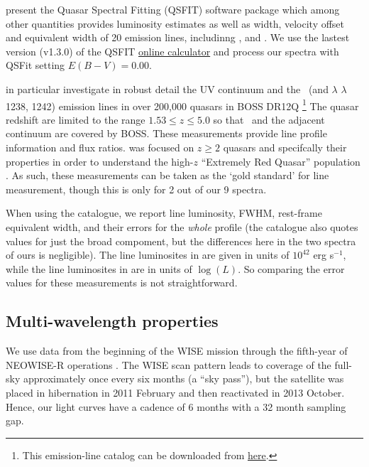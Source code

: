 \documentclass[a4paper,fleqn,usenatbib]{mnras}
\begin{document}
\citet{Calderone2017} present the Quasar Spectral Fitting (QSFIT)
software package which among other quantities provides luminosity
estimates as well as width, velocity offset and equivalent width of 20
emission lines, includinng \civ, \ciii and \mgii.  We use the lastest
version (v1.3.0) of the QSFIT
\href{https://qsfit.inaf.it/cat_1.30/onlinefit.php}{online calculator}
and process our spectra with QSFit setting $E(B-V)=0.00$.

\citet{Hamann2017} in
particular investigate in robust detail the UV continuum and the \civ\
(and \nv $\lambda$ $\lambda$1238, 1242) emission lines in over 200,000
quasars in BOSS DR12Q \citep{Paris2017}\footnote{This emission-line
catalog can be downloaded from
\href{https://datadryad.org/stash/dataset/doi:10.6086/D1H59V}{here}.}
The quasar redshift are limited to the range $1.53 \leq z \leq 5.0$ so
that \civ\ and the adjacent continuum are covered by BOSS. These
measurements provide line profile information and flux ratios.
\citet{Hamann2017} was focused on $z\geq2$ quasars and specifcally
their \civ properties in order to understand the high-$z$ ``Extremely Red Quasar''
population \citet{Ross2015, Zakamska2016, Perrotta2019, Zakamska2019}. 
As such, these measurements can be taken as the
`gold standard' for \civ line measurement, though this is only for 2
out of our 9 spectra. 

 When using the \citet{Shen2011} catalogue, we report line luminosity,
FWHM, rest-frame equivalent width, and their errors for the {\it
whole} \mgii profile (the \citet{Shen2011} catalogue also quotes values
for just the broad \mgii compoment, but the differences here in the
two spectra of ours is negligible). The line luminosites in
\citet{Calderone2017} are given in units of $10^{42}$ erg s$^{-1}$,
while the line luminosites in \citet{Shen2011} are in units of
$\log(L)$.  So comparing the error values for these measurements is
not straightforward.



\subsection{Multi-wavelength properties}
We use data from the beginning of the WISE mission \citep[2010
January; ][]{Wright2010} through the fifth-year of NEOWISE-R
operations \citep[2018 December; ][]{Mainzer2011}. The WISE scan
pattern leads to coverage of the full-sky approximately once every six
months (a ``sky pass''), but the satellite was placed in hibernation
in 2011 February and then reactivated in 2013 October. Hence, our
light curves have a cadence of 6 months with a 32 month sampling gap.
\end{document}
